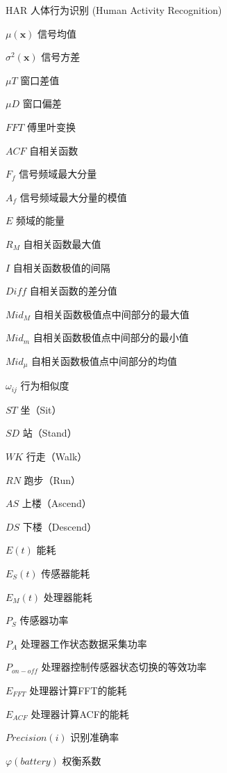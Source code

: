 ﻿\begin{denotation}

\item[HAR] 人体行为识别 (Human Activity Recognition)
\item[$\mu (\textbf{x})$] 信号均值
\item[$\sigma ^2 (\textbf{x})$] 信号方差
\item[$\mu T$]  窗口差值
\item[$\mu D$]  窗口偏差
\item[$FFT$]    傅里叶变换
\item[$ACF$]    自相关函数
\item[$F_f$]    信号频域最大分量
\item[$A_f$]    信号频域最大分量的模值
\item[$E$]      频域的能量
\item[$R_M$]    自相关函数最大值
\item[$I$]      自相关函数极值的间隔
\item[$Diff$]   自相关函数的差分值
\item[$Mid_M$]  自相关函数极值点中间部分的最大值
\item[$Mid_m$]  自相关函数极值点中间部分的最小值
\item[$Mid_{\mu}$]  自相关函数极值点中间部分的均值
\item[$\omega_{ij}$] 行为相似度
\item[$ST$] 坐（Sit）
\item[$SD$] 站（Stand）
\item[$WK$] 行走（Walk）
\item[$RN$] 跑步（Run）
\item[$AS$] 上楼（Ascend）
\item[$DS$] 下楼（Descend）
\item[$E(t)$]   能耗
\item[$E_S(t)$] 传感器能耗
\item[$E_M(t)$] 处理器能耗
\item[$P_S$]    传感器功率
\item[$P_A$]    处理器工作状态数据采集功率
\item[$P_{on-off}$] 处理器控制传感器状态切换的等效功率
\item[$E_{FFT}$]    处理器计算FFT的能耗
\item[$E_{ACF}$]    处理器计算ACF的能耗
\item[$Precision(i)$]   识别准确率
\item[$\varphi (battery)$]  权衡系数
\item[$$]
\item[$$]
\item[$$]
\item[$$]
\end{denotation}
